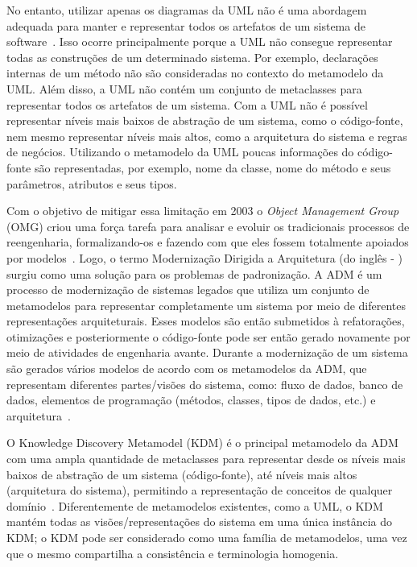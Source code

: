 No entanto, utilizar apenas os diagramas da UML não é uma abordagem adequada para manter e representar todos os artefatos de um sistema de software~\cite{Gorp, KolahdouzRahimi20145, revisao_sistematica_uml_refactoring}. Isso ocorre principalmente porque a UML não consegue representar todas as construções de um determinado sistema. Por exemplo, declarações internas de um método não são consideradas no contexto do metamodelo da UML. Além disso, a UML não contém um conjunto de metaclasses para representar todos os artefatos de um sistema. Com a UML não é possível representar níveis mais baixos de abstração de um sistema, como o código-fonte, nem mesmo representar níveis mais altos, como a arquitetura do sistema e regras de negócios. Utilizando o metamodelo da UML poucas informações do código-fonte são representadas, por exemplo, nome da classe, nome do método e seus parâmetros, atributos e seus tipos.  

Com o objetivo de mitigar essa limitação em 2003 o \textit{Object Management Group} (OMG) criou uma força tarefa para analisar e evoluir os tradicionais processos de reengenharia, formalizando-os e fazendo com que eles fossem totalmente apoiados por modelos~\cite{ADM:OMG}. Logo, o termo Modernização Dirigida a Arquitetura (do inglês - ) surgiu como uma solução para os problemas de padronização. A ADM é um processo de modernização de sistemas legados que utiliza um conjunto de metamodelos para representar completamente um sistema por meio de diferentes representações arquiteturais. Esses modelos são então submetidos à refatorações, otimizações e posteriormente o código-fonte pode ser então gerado novamente por meio de atividades de engenharia avante. Durante a modernização de um sistema são gerados vários modelos de acordo com os metamodelos da ADM, que representam diferentes partes/visões do sistema, como: fluxo de dados, banco de dados, elementos de programação (métodos, classes, tipos de dados, etc.) e arquitetura~\cite{PerezCastillo20121370}.

O Knowledge Discovery Metamodel (KDM) é o principal metamodelo da ADM com uma ampla quantidade de metaclasses para representar desde os níveis mais baixos de abstração de um sistema (código-fonte), até níveis mais altos (arquitetura do sistema), permitindo a representação de conceitos de qualquer domínio~\cite{KDM:specification,KDM:ISO}. Diferentemente de metamodelos existentes, como a UML, o KDM mantém todas as visões/representações do sistema em uma única instância do KDM; o KDM pode ser considerado como uma família de metamodelos, uma vez que o mesmo compartilha a consistência e terminologia homogenia. 

